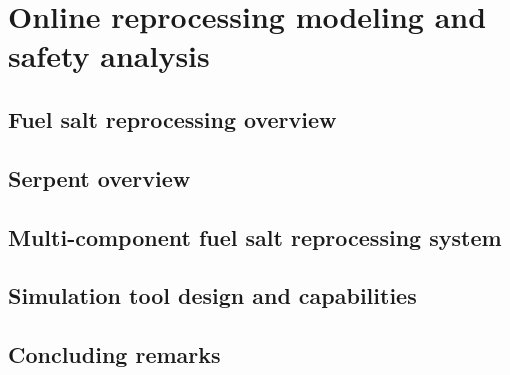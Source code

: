 \chapter[Online reprocessing modeling and safety analysis]{Online reprocessing 
	modeling and safety analysis}
\section{Fuel salt reprocessing overview} \label{sec:reproc-plant}

\section{Serpent overview}

\section{Multi-component fuel salt reprocessing system}

\section{Simulation tool design and capabilities} 
\label{sec:tool_design}

\section{Concluding remarks}